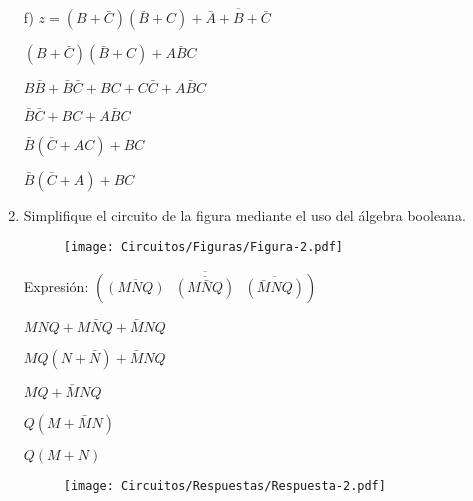 \documentclass[a4paper, 12pt]{article}
\newcommand{\Pspace}{0.5cm}
\newcommand{\Aspace}{0.2cm}
\begin{document}
\begin{enumerate}
            \newpage
            \vspace{\Aspace} \par
            f) $z = (B + \bar{C})(\bar{B} + C) + \overline{\bar{A} + B + \bar{C}}$
            \\ { \color{azul} 
                $(B + \bar{C})(\bar{B} + C) + A\bar{B}C$
                \par $B\bar{B} + \bar{B}\bar{C} + BC + C\bar{C} + A\bar{B}C$
                \par $\bar{B}\bar{C} + BC + A\bar{B}C$
                \par $\bar{B}(\bar{C} + AC) + BC$
                \par $\bar{B}(\bar{C} + A) + BC$
            }



        \vspace{\Pspace}
        \item Simplifique el circuito de la figura mediante el uso del álgebra booleana. \par
        \begin{figure}[!ht]
            \centering
            \texttt{[image: Circuitos/Figuras/Figura-2.pdf]}
        \end{figure}
            \vspace{\Aspace} \par
            { \color{azul} Expresión: $\overline{(\overline{(MNQ)} \text{ } \overline{(M\bar{N}Q)} \text{ } \overline{(\bar{M}NQ)})}$
                \par $MNQ + M\bar{N}Q + \bar{M}NQ$
                \par $MQ(N + \bar{N}) + \bar{M}NQ$
                \par $MQ + \bar{M}NQ$
                \par $Q(M + \bar{M}N)$
                \par $Q(M + N)$
                \begin{figure}[!ht]
                    \centering
                    \texttt{[image: Circuitos/Respuestas/Respuesta-2.pdf]}
                \end{figure}
            }




\end{enumerate}
\end{document}
